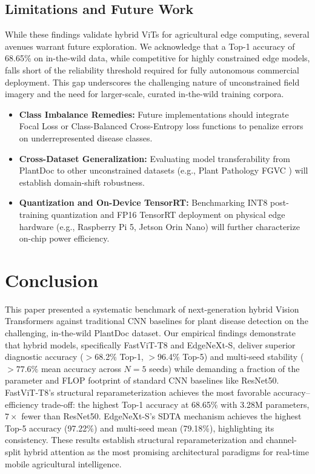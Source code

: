 \documentclass[conference]{IEEEtran}
\begin{document}
\subsection{Limitations and Future Work}\label{sec:limitations}
While these findings validate hybrid ViTs for agricultural edge computing, several avenues warrant future exploration. We acknowledge that a Top-1 accuracy of 68.65\% on in-the-wild data, while competitive for highly constrained edge models, falls short of the reliability threshold required for fully autonomous commercial deployment. This gap underscores the challenging nature of unconstrained field imagery and the need for larger-scale, curated in-the-wild training corpora.
\begin{itemize}
    \item \textbf{Class Imbalance Remedies:} Future implementations should integrate Focal Loss or Class-Balanced Cross-Entropy loss functions to penalize errors on underrepresented disease classes.
    \item \textbf{Cross-Dataset Generalization:} Evaluating model transferability from PlantDoc to other unconstrained datasets (e.g., Plant Pathology FGVC \cite{plantpath2021}) will establish domain-shift robustness.
    \item \textbf{Quantization and On-Device TensorRT:} Benchmarking INT8 post-training quantization and FP16 TensorRT deployment on physical edge hardware (e.g., Raspberry Pi 5, Jetson Orin Nano) will further characterize on-chip power efficiency.
\end{itemize}

\section{Conclusion}
This paper presented a systematic benchmark of next-generation hybrid Vision Transformers against traditional CNN baselines for plant disease detection on the challenging, in-the-wild PlantDoc dataset. Our empirical findings demonstrate that hybrid models, specifically FastViT-T8 and EdgeNeXt-S, deliver superior diagnostic accuracy ($>$68.2\% Top-1, $>$96.4\% Top-5) and multi-seed stability ($>77.6\%$ mean accuracy across $N=5$ seeds) while demanding a fraction of the parameter and FLOP footprint of standard CNN baselines like ResNet50. FastViT-T8's structural reparameterization achieves the most favorable accuracy--efficiency trade-off: the highest Top-1 accuracy at 68.65\% with 3.28M parameters, $7\times$ fewer than ResNet50. EdgeNeXt-S's SDTA mechanism achieves the highest Top-5 accuracy (97.22\%) and multi-seed mean (79.18\%), highlighting its consistency. These results establish structural reparameterization and channel-split hybrid attention as the most promising architectural paradigms for real-time mobile agricultural intelligence.



\end{document}
